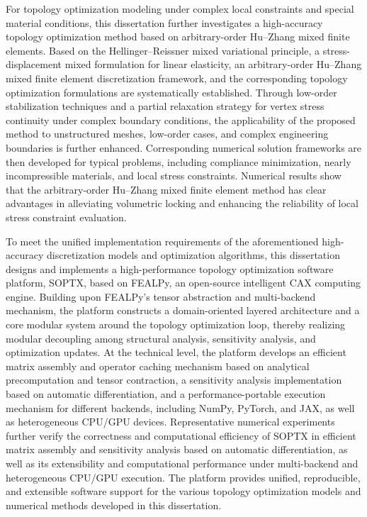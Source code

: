\begin{enabstract}
	For topology optimization modeling under complex local constraints and special material conditions, this dissertation further investigates a high-accuracy topology optimization method based on arbitrary-order Hu–Zhang mixed finite elements. Based on the Hellinger–Reissner mixed variational principle, a stress-displacement mixed formulation for linear elasticity, an arbitrary-order Hu–Zhang mixed finite element discretization framework, and the corresponding topology optimization formulations are systematically established. Through low-order stabilization techniques and a partial relaxation strategy for vertex stress continuity under complex boundary conditions, the applicability of the proposed method to unstructured meshes, low-order cases, and complex engineering boundaries is further enhanced. Corresponding numerical solution frameworks are then developed for typical problems, including compliance minimization, nearly incompressible materials, and local stress constraints. Numerical results show that the arbitrary-order Hu–Zhang mixed finite element method has clear advantages in alleviating volumetric locking and enhancing the reliability of local stress constraint evaluation.
	
	To meet the unified implementation requirements of the aforementioned high-accuracy discretization models and optimization algorithms, this dissertation designs and implements a high-performance topology optimization software platform, SOPTX, based on FEALPy, an open-source intelligent CAX computing engine. Building upon FEALPy’s tensor abstraction and multi-backend mechanism, the platform constructs a domain-oriented layered architecture and a core modular system around the topology optimization loop, thereby realizing modular decoupling among structural analysis, sensitivity analysis, and optimization updates. At the technical level, the platform develops an efficient matrix assembly and operator caching mechanism based on analytical precomputation and tensor contraction, a sensitivity analysis implementation based on automatic differentiation, and a performance-portable execution mechanism for different backends, including NumPy, PyTorch, and JAX, as well as heterogeneous CPU/GPU devices. Representative numerical experiments further verify the correctness and computational efficiency of SOPTX in efficient matrix assembly and sensitivity analysis based on automatic differentiation, as well as its extensibility and computational performance under multi-backend and heterogeneous CPU/GPU execution. The platform provides unified, reproducible, and extensible software support for the various topology optimization models and numerical methods developed in this dissertation.
	

\end{enabstract}
